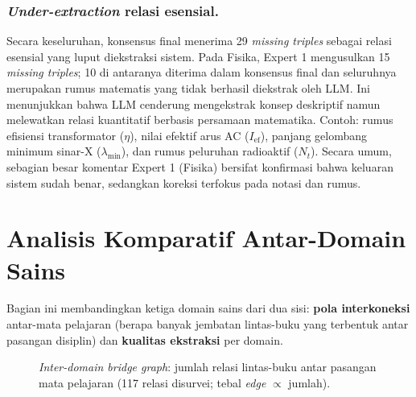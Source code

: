 \documentclass[../../thesis]{subfiles}
\begin{document}
\subsubsection{\textit{Under-extraction} relasi esensial.} Secara keseluruhan, konsensus final
menerima 29 \textit{missing triples} sebagai relasi esensial yang luput
diekstraksi sistem. Pada Fisika, Expert 1 mengusulkan 15 \textit{missing triples};
10 di antaranya diterima dalam konsensus final dan seluruhnya merupakan rumus matematis
yang tidak berhasil diekstrak oleh LLM. Ini menunjukkan bahwa LLM cenderung
mengekstrak konsep deskriptif namun melewatkan relasi kuantitatif berbasis
persamaan matematika. Contoh: rumus efisiensi transformator ($\eta$), nilai
efektif arus AC ($I_\text{ef}$), panjang gelombang minimum sinar-X
($\lambda_\text{min}$), dan rumus peluruhan radioaktif ($N_t$). Secara umum,
sebagian besar komentar Expert 1 (Fisika) bersifat konfirmasi bahwa keluaran
sistem sudah benar, sedangkan koreksi terfokus pada notasi dan rumus.

\section{Analisis Komparatif Antar-Domain Sains}\label{subsec:komparatif}

Bagian ini membandingkan ketiga domain sains dari dua sisi: \textbf{pola
interkoneksi} antar-mata pelajaran (berapa banyak jembatan lintas-buku
yang terbentuk antar pasangan disiplin) dan \textbf{kualitas ekstraksi}
per domain.

\begin{figure}[htbp]
  \centering
  \caption{\textit{Inter-domain bridge graph}: jumlah relasi lintas-buku antar
    pasangan mata pelajaran (117 relasi disurvei; tebal \textit{edge} $\propto$ jumlah).}
  \label{fig:bridge-graph}
\end{figure}
\end{document}
